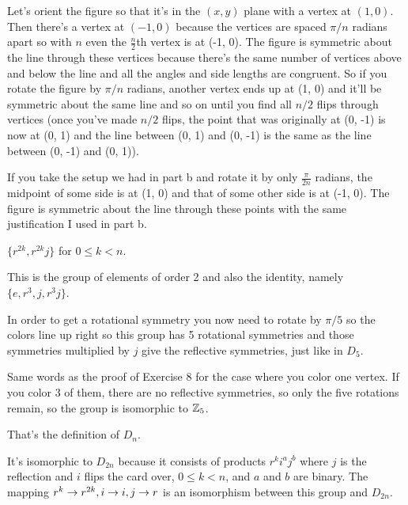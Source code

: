 \documentclass[11pt, oneside]{article}   	%
\begin{document}
\item Let's orient the figure so that it's in the $(x, y)$ plane with a vertex at $(1, 0)$. Then there's a vertex at $(-1, 0)$ because the vertices are spaced $\pi/n$ radians apart so with $n$ even the $\frac{n}{2}$th vertex is at (-1, 0). The figure is symmetric about the line through these vertices because there's the same number of vertices above and below the line and all the angles and side lengths are congruent. So if you rotate the figure by $\pi/n$ radians, another vertex ends up at (1, 0) and it'll be symmetric about the same line and so on until you find all $n/2$ flips through vertices (once you've made $n/2$ flips, the point that was originally at (0, -1) is now at (0, 1) and the line between (0, 1) and (0, -1) is the same as the line between (0, -1) and (0, 1)).
\item If you take the setup we had in part b and rotate it by only $\frac{\pi}{2n}$ radians, the midpoint of some side is at (1, 0) and that of some other side is at (-1, 0). The figure is symmetric about the line through these points with the same justification I used in part b.
\ee
\item $\{r^{2k}, r^{2k}j\}$ for $0 \le k < n$.
\item This is the group of elements of order 2 and also the identity, namely $\{e, r^3, j, r^3j\}$.
\item In order to get a rotational symmetry you now need to rotate by $\pi/5$ so the colors line up right so this group has 5 rotational symmetries and those symmetries multiplied by $j$ give the reflective symmetries, just like in $D_5$.
\item Same words as the proof of Exercise 8 for the case where you color one vertex. If you color 3 of them, there are no reflective symmetries, so only the five rotations remain, so the group is isomorphic to $\mathbb{Z}_5$.
\item That's the definition of $D_n$.
\item It's isomorphic to $D_{2n}$ because it consists of products $r^ki^aj^b$ where $j$ is the reflection and $i$ flips the card over, $0 \le k < n$, and $a$ and $b$ are binary. The mapping $r^k \rightarrow r^{2k}, i \rightarrow i, j \rightarrow r$ is an isomorphism between this group and $D_{2n}$.
\ee
\end{document}
